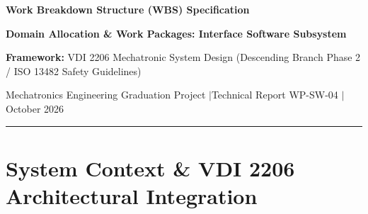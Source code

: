 \documentclass[10pt,a4paper]{article}
\begin{document}
\begin{center}
    {\LARGE\bfseries\color{navy} Work Breakdown Structure (WBS) Specification\par}
    \vspace{0.4em}
    {\Large\bfseries\color{teal} Domain Allocation \& Work Packages: Interface Software Subsystem\par}
    \vspace{0.5em}
    {\small\textbf{Framework:} VDI 2206 Mechatronic System Design (Descending Branch Phase 2 / ISO 13482 Safety Guidelines)\par}
    \vspace{0.2em}
    {\footnotesize Mechatronics Engineering Graduation Project \quad$\vert$\quad Technical Report WP-SW-04 \quad$\vert$\quad October 2026\par}
\end{center}

\vspace{0.5em}
\hrule height 1.2pt
\vspace{1.0em}

\begin{abstract}
This engineering specification defines the formal Work Breakdown Structure (WBS) for the \textbf{Interface Software Subsystem} (WP-SW-04) of the modular semi-humanoid robotic platform. In compliance with the \textbf{VDI 2206} design methodology for mechatronic and cyber-physical systems (CPS), the software domain is decomposed into six canonical pillars: Navigation (Nav2), Arm Control (MoveIt~2), Machine Vision, Interface, Vision-Language-Action (VLA), and Low-Level Firmware (\texttt{micro\_ros} + \texttt{ros2\_control}). Within this hierarchy, the Interface Subsystem bridges high-level cognitive models, deterministic control middleware, human operators, and distributed edge networks. This document details the Level-2 through Level-4 decomposition of the five interface pillars: \textbf{(1) Browser Teleoperation \& Web Dashboard, (2) Standardized Task Port Gateway, (3) Autonomous Skill Marketplace \& Registry, (4) Physical \& Ambient HMI, and (5) Developer Client SDK \& API Gateways}. For each work package, technical scopes, engineering deliverables, interface contracts, and quantifiable acceptance verification metrics are rigorously formulated.
\end{abstract}

\section{System Context \& VDI 2206 Architectural Integration}
\label{sec:system_context}
\end{document}
